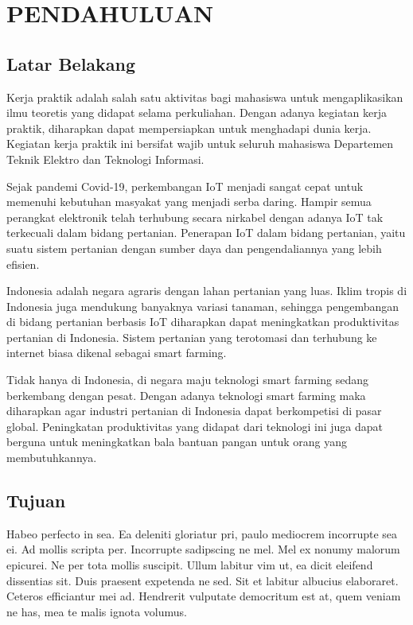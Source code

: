 
\chapter{PENDAHULUAN}

\section{Latar Belakang}
Kerja praktik adalah salah satu aktivitas bagi mahasiswa untuk mengaplikasikan ilmu teoretis yang didapat selama perkuliahan. Dengan adanya kegiatan kerja praktik, diharapkan dapat mempersiapkan untuk menghadapi dunia kerja. Kegiatan kerja praktik ini bersifat wajib untuk seluruh mahasiswa Departemen Teknik Elektro dan Teknologi Informasi.

Sejak pandemi Covid-19, perkembangan IoT menjadi sangat cepat untuk memenuhi kebutuhan masyakat yang menjadi serba daring. Hampir semua perangkat elektronik telah terhubung secara nirkabel dengan adanya IoT tak terkecuali dalam bidang pertanian. Penerapan IoT dalam bidang pertanian, yaitu suatu sistem pertanian dengan sumber daya dan pengendaliannya yang lebih efisien.

Indonesia adalah negara agraris dengan lahan pertanian yang luas. Iklim tropis di Indonesia juga mendukung banyaknya variasi tanaman, sehingga pengembangan di bidang pertanian berbasis IoT diharapkan dapat meningkatkan produktivitas pertanian di Indonesia. Sistem pertanian yang terotomasi dan terhubung ke internet biasa dikenal sebagai smart farming.

Tidak hanya di Indonesia, di negara maju teknologi smart farming sedang berkembang dengan pesat. Dengan adanya teknologi smart farming maka diharapkan agar industri pertanian di Indonesia dapat berkompetisi di pasar global. Peningkatan produktivitas yang didapat dari teknologi ini juga dapat berguna untuk meningkatkan bala bantuan pangan untuk orang yang membutuhkannya.

\section{Tujuan}
Habeo perfecto in sea. Ea deleniti gloriatur pri, paulo mediocrem incorrupte sea ei. Ad mollis scripta per. Incorrupte sadipscing ne mel. Mel ex nonumy malorum epicurei. Ne per tota mollis suscipit. Ullum labitur vim ut, ea dicit eleifend dissentias sit. Duis praesent expetenda ne sed. Sit et labitur albucius elaboraret. Ceteros efficiantur mei ad. Hendrerit vulputate democritum est at, quem veniam ne has, mea te malis ignota volumus.


